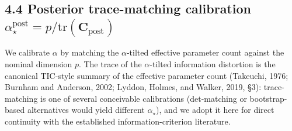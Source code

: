 \documentclass[11pt]{article}
\begin{document}
\subsection*{4.4 Posterior trace-matching calibration $\alpha_\star^{\mathrm{post}} = p / \mathrm{tr}(\mathbf C_{\mathrm{post}})$}

We calibrate $\alpha$ by matching the $\alpha$-tilted effective parameter count
against the nominal dimension $p$. The trace of the $\alpha$-tilted information
distortion is the canonical TIC-style summary of the effective parameter count
(Takeuchi, 1976; Burnham and Anderson, 2002; Lyddon, Holmes, and Walker, 2019,
\S3): trace-matching is one of several conceivable calibrations (det-matching
or bootstrap-based alternatives would yield different $\alpha_\star$), and we
adopt it here for direct continuity with the established information-criterion
literature.
\end{document}
